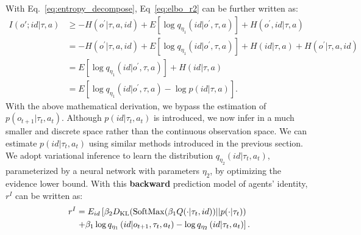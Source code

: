 With Eq.~\ref{eq:entropy_decompose}, Eq~\ref{eq:elbo_r2} can be further written as:
\begin{equation}
\begin{aligned} 
I(o'; id | \tau, a) & \geq -H\left(o^{\prime} | \tau, a, id\right)+E\left[\log q_{\eta_1}\left(id | o^{\prime}, \tau, a\right)\right]+H\left(o^{\prime}, id | \tau, a\right)
\\ &= -H\left(o^{\prime} | \tau, a, id\right) + E\left[\log q_{\eta_1}\left(id | o^{\prime}, \tau, a\right)\right]+H(id | \tau, a) + H\left(o^{\prime} | \tau, a, id\right)
\\ &= E\left[\log q_{\eta_1}\left(id | o^{\prime}, \tau, a\right)\right]+H(id | \tau, a)
\\ &= E\left[\log q_{\eta_1}\left(id | o^{\prime}, \tau, a\right) - \log p(id | \tau, a)\right].
\end{aligned}
\label{eq:r2_end}
\end{equation}
With the above mathematical derivation, we bypass the estimation of $p\left(o_{t+1} | \tau_{t}, a_{t}\right)$. Although $p(id | \tau_t, a_t)$ is introduced, we now infer in a much smaller and discrete space rather than the continuous observation space. We can estimate $p(id | \tau_t, a_t)$ using similar methods introduced in the previous section. We adopt variational inference to learn the distribution $q_{\eta_2}\left(i d | \tau_{t}, a_t\right)$, parameterized by a neural network with parameters $\eta_2$, by optimizing the evidence lower bound. With this \textbf{backward} prediction model of agents' identity, $r^I$ can be written as:
\begin{equation}
\begin{aligned} 
r^I &=  E_{id}\left[\beta_2 D_{\mathrm{KL}}({\rm SoftMax}(\beta_1 Q(\cdot | \tau_t, id)) || p(\cdot| \tau_t)) \right.
\\& \left.+ \beta_1 \log q_{\eta_1}\left(id | o_{t+1}, \tau_t, a_t\right)-\log q_{\eta_2}\left(i d | \tau_{t}, a_t\right)\right].
\end{aligned}
\label{final reward_back}
\end{equation}

